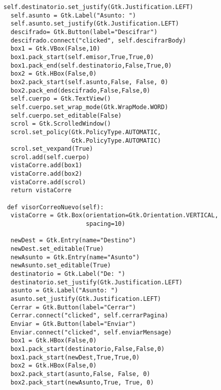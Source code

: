 \begin{lstlisting}[frame=single]
  self.destinatorio.set_justify(Gtk.Justification.LEFT)
  self.asunto = Gtk.Label("Asunto: ")
  self.asunto.set_justify(Gtk.Justification.LEFT)
  descifrado= Gtk.Button(label="Descifrar")
  descifrado.connect("clicked", self.descifrarBody)
  box1 = Gtk.VBox(False,10)
  box1.pack_start(self.emisor,True,True,0)
  box1.pack_end(self.destinatorio,False,True,0)
  box2 = Gtk.HBox(False,0)
  box2.pack_start(self.asunto,False, False, 0)
  box2.pack_end(descifrado,False,False,0)
  self.cuerpo = Gtk.TextView()
  self.cuerpo.set_wrap_mode(Gtk.WrapMode.WORD)
  self.cuerpo.set_editable(False)
  scrol = Gtk.ScrolledWindow()
  scrol.set_policy(Gtk.PolicyType.AUTOMATIC, 
                   Gtk.PolicyType.AUTOMATIC)
  scrol.set_vexpand(True)
  scrol.add(self.cuerpo)
  vistaCorre.add(box1)
  vistaCorre.add(box2)
  vistaCorre.add(scrol)
  return vistaCorre

 def visorCorreoNuevo(self):
  vistaCorre = Gtk.Box(orientation=Gtk.Orientation.VERTICAL, 
                       spacing=10)
                       
  newDest = Gtk.Entry(name="Destino")
  newDest.set_editable(True)
  newAsunto = Gtk.Entry(name="Asunto")
  newAsunto.set_editable(True)
  destinatorio = Gtk.Label("De: ")
  destinatorio.set_justify(Gtk.Justification.LEFT)
  asunto = Gtk.Label("Asunto: ")
  asunto.set_justify(Gtk.Justification.LEFT)
  Cerrar = Gtk.Button(label="Cerrar")
  Cerrar.connect("clicked", self.cerrarPagina)
  Enviar = Gtk.Button(label="Enviar")
  Enviar.connect("clicked", self.enviarMensage)
  box1 = Gtk.HBox(False,0)
  box1.pack_start(destinatorio,False,False,0)
  box1.pack_start(newDest,True,True,0)  
  box2 = Gtk.HBox(False,0)
  box2.pack_start(asunto,False, False, 0)
  box2.pack_start(newAsunto,True, True, 0)
\end{lstlisting}
